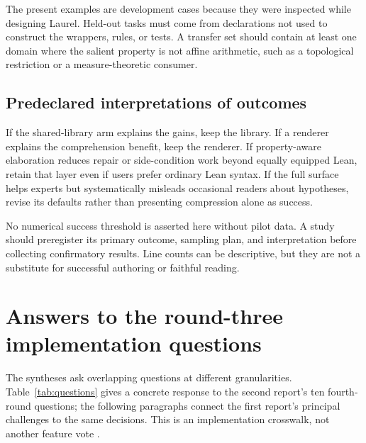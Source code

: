 \documentclass[11pt,a4paper]{article}
\theoremstyle{definition}
\theoremstyle{remark}
\begin{document}
The present examples are development cases because they were inspected while designing Laurel. Held-out tasks must come from declarations not used to construct the wrappers, rules, or tests. A transfer set should contain at least one domain where the salient property is not affine arithmetic, such as a topological restriction or a measure-theoretic consumer.

\subsection{Predeclared interpretations of outcomes}
If the shared-library arm explains the gains, keep the library. If a renderer explains the comprehension benefit, keep the renderer. If property-aware elaboration reduces repair or side-condition work beyond equally equipped Lean, retain that layer even if users prefer ordinary Lean syntax. If the full surface helps experts but systematically misleads occasional readers about hypotheses, revise its defaults rather than presenting compression alone as success.

No numerical success threshold is asserted here without pilot data. A study should preregister its primary outcome, sampling plan, and interpretation before collecting confirmatory results. Line counts can be descriptive, but they are not a substitute for successful authoring or faithful reading.

\section{Answers to the round-three implementation questions}\label{sec:crosswalk}
The syntheses ask overlapping questions at different granularities. Table~\ref{tab:questions} gives a concrete response to the second report's ten fourth-round questions; the following paragraphs connect the first report's principal challenges to the same decisions. This is an implementation crosswalk, not another feature vote \cite{r3a,r3b}.
\end{document}
